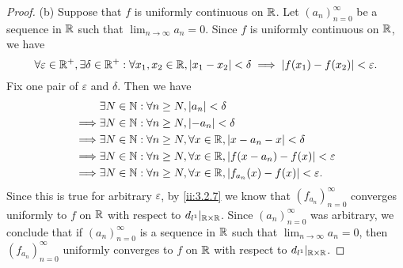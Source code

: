 \begin{proof}{(b)}
  Suppose that \(f\) is uniformly continuous on \(\mathbb{R}\).
  Let \((a_n)_{n = 0}^\infty\) be a sequence in \(\mathbb{R}\) such that \(\lim_{n \to \infty} a_n = 0\).
  Since \(f\) is uniformly continuous on \(\mathbb{R}\), we have
  \[
    \forall \varepsilon \in \mathbb{R}^+, \exists \delta \in \mathbb{R}^+ : \forall x_1, x_2 \in \mathbb{R}, \left\lvert x_1 - x_2\right\rvert < \delta \implies \left\lvert f(x_1) - f(x_2)\right\rvert < \varepsilon.
  \]
  Fix one pair of \(\varepsilon\) and \(\delta\).
  Then we have
  \begin{align*}
             & \exists N \in \mathbb{N} : \forall n \geq N, \left\lvert a_n\right\rvert < \delta                                       \\
    \implies & \exists N \in \mathbb{N} : \forall n \geq N, \left\lvert-a_n\right\rvert < \delta                                      \\
    \implies & \exists N \in \mathbb{N} : \forall n \geq N, \forall x \in \mathbb{R}, \left\lvert x - a_n - x\right\rvert < \delta             \\
    \implies & \exists N \in \mathbb{N} : \forall n \geq N, \forall x \in \mathbb{R}, \left\lvert f(x - a_n) - f(x)\right\rvert < \varepsilon  \\
    \implies & \exists N \in \mathbb{N} : \forall n \geq N, \forall x \in \mathbb{R}, \left\lvert f_{a_n}(x) - f(x)\right\rvert < \varepsilon.
  \end{align*}
  Since this is true for arbitrary \(\varepsilon\), by \cref{ii:3.2.7} we know that \((f_{a_n})_{n = 0}^\infty\) converges uniformly to \(f\) on \(\mathbb{R}\) with respect to \(d_{l^1}|_{\mathbb{R} \times \mathbb{R}}\).
  Since \((a_n)_{n = 0}^\infty\) was arbitrary, we conclude that if \((a_n)_{n = 0}^\infty\) is a sequence in \(\mathbb{R}\) such that \(\lim_{n \to \infty} a_n = 0\), then \((f_{a_n})_{n = 0}^\infty\) uniformly converges to \(f\) on \(\mathbb{R}\) with respect to \(d_{l^1}|_{\mathbb{R} \times \mathbb{R}}\).


\end{proof}
